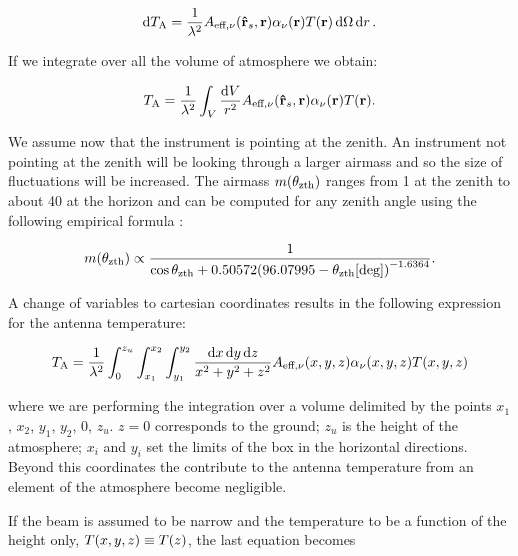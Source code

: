 \begin{equation}
        \dd{T_\text{A}} = \frac{1}{\lambda^2} A_{\text{eff},\nu}
        \qty(\vectorunit{r}_s,\vb{r}) \alpha_\nu\qty(\vb{r}) T\qty(\vb{r})
        \dd{\Omega}\dd{r}.
\end{equation}

If we integrate over all the volume of atmosphere we obtain:

\begin{equation}
        T_\text{A} = \frac{1}{\lambda^2} \int_V \frac{\dd{V}}{r^2}
        A_{\text{eff},\nu} \qty(\vectorunit{r}_s,\vb{r})
        \alpha_\nu\qty(\vb{r}) T\qty(\vb{r}).
\end{equation}

We assume now that the instrument is pointing at the
zenith. An instrument not pointing at the zenith will be looking through a
larger airmass and so the size of fluctuations will be increased.
The airmass $m\qty(\theta_\text{zth})$ ranges from \num{1} at the zenith to
about \num{40} at the horizon and can be computed for any zenith angle
using the following empirical formula \autocite{errard2015modeling}:

\begin{equation}
        m\qty(\theta_\text{zth}) \propto
        \frac{1}{\cos \theta_\text{zth} + 0.50572
        \qty(96.07995 - \theta_\text{zth}[\text{deg}])^{-1.6364}}.
\end{equation}

A change of variables to cartesian coordinates results in the following
expression for the antenna temperature:

\begin{equation}
        T_\text{A} = \frac{1}{\lambda^2} \int^{z_u}_0 \int^{x_2}_{x_1}
        \int^{y_2}_{y_1} \frac{\dd{x}\dd{y}\dd{z}}{x^2 + y^2 + z^2}
        A_{\text{eff},\nu}\qty(x,y,z)
        \alpha_\nu\qty(x,y,z) T\qty(x,y,z)
\end{equation}

where we are performing the integration over a volume delimited by the
points $x_1$, $x_2$, $y_1$, $y_2$, 0, $z_u$. $z = 0$ corresponds to
the ground; $z_u$ is the height of the atmosphere; $x_i$ and $y_i$ set the
limits of the box in the horizontal directions. Beyond this coordinates the
contribute to the antenna temperature from an element of the atmosphere
become negligible.

If the beam is assumed to be narrow and the temperature to be a function
of the height only, $T\qty(x,y,z) \equiv T\qty(z)$, the last equation
becomes

